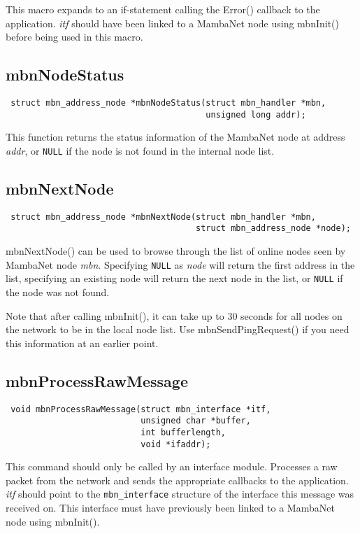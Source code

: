 \documentclass[a4paper]{report}
\begin{document}
This macro expands to an if-statement calling the Error() callback to the application. \textit{itf} should have been linked to a MambaNet node using mbnInit() before being used in this macro.


\subsection{mbnNodeStatus}
\begin{verbatim}
 struct mbn_address_node *mbnNodeStatus(struct mbn_handler *mbn,
                                        unsigned long addr);
\end{verbatim}
This function returns the status information of the MambaNet node at address \textit{addr}, or \verb|NULL| if the node is not found in the internal node list.


\subsection{mbnNextNode}
\begin{verbatim}
 struct mbn_address_node *mbnNextNode(struct mbn_handler *mbn,
                                      struct mbn_address_node *node);
\end{verbatim}
mbnNextNode() can be used to browse through the list of online nodes seen by MambaNet node \textit{mbn}. Specifying \verb|NULL| as \textit{node} will return the first address in the list, specifying an existing node will return the next node in the list, or \verb|NULL| if the node was not found.

Note that after calling mbnInit(), it can take up to 30 seconds for all nodes on the network to be in the local node list. Use mbnSendPingRequest() if you need this information at an earlier point.


\subsection{mbnProcessRawMessage}
\begin{verbatim}
 void mbnProcessRawMessage(struct mbn_interface *itf,
                           unsigned char *buffer,
                           int bufferlength,
                           void *ifaddr);
\end{verbatim}
This command should only be called by an interface module. Processes a raw packet from the network and sends the appropriate callbacks to the application. \textit{itf} should point to the \verb|mbn_interface| structure of the interface this message was received on. This interface must have previously been linked to a MambaNet node using mbnInit().
\end{document}

